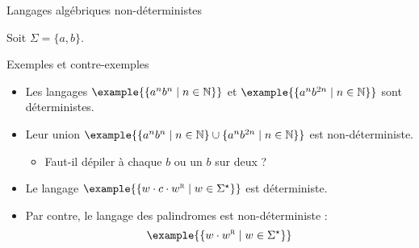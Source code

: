 
\begingroup

\begin{frame}{Langages algébriques non-déterministes}
  
  Soit $\Sigma = \{a, b\}$.
  
  \begin{exampleblock}{Exemples et contre-exemples}
    \begin{itemize}
    \item Les langages $\example{\{ a^n b^n \mid n\in \mathbb{N}\}}$ et $\example{\{ a^n b^{2n} \mid n\in \mathbb{N}\}}$ sont déterministes.
    \item\vspace{2mm} Leur union $\example{\{ a^n b^n \mid n\in \mathbb{N}\} \cup \{ a^n b^{2n} \mid n\in \mathbb{N}\}}$ est non-déterministe.
      \begin{itemize}
      \item Faut-il dépiler à chaque $b$ ou un $b$ sur deux ? 
      \end{itemize}
    \item\vspace{2mm} Le langage $\example{\{ w \cdot c \cdot w^{\textsc{r}} \mid w\in \Sigma^\star\}}$ est déterministe.
      \begin{center}
      \end{center}
    \item\vspace{2mm} Par contre, le langage des palindromes est non-déterministe :
      $$\example{\{ w \cdot w^{\textsc{r}} \mid w\in \Sigma^\star\}}$$
    \end{itemize}
  \end{exampleblock}

\end{frame}

\endgroup
